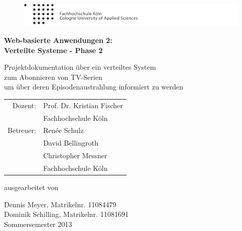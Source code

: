 
\begin{titlepage}

\begin{center}

\begin{figure}[!ht]
	\centering
		\includegraphics[natwidth=920pt, natheight=95pt, width=1.0\textwidth]{inc/logoheader.pdf}
\end{figure}

\vspace{4.0cm}

\begin{Huge}
	\textbf{Web-basierte Anwendungen 2:}\\
	\vspace{0.1cm}
	\textbf{Verteilte Systeme - Phase 2}\\
\end{Huge}

\vspace{0.8cm}

\begin{LARGE}
	Projektdokumentation über ein verteiltes System\\
	\vspace{0.1cm}
	zum Abonnieren von TV-Serien\\
	\vspace{0.1cm}
	um über deren Episodenaustrahlung informiert zu werden\\
\end{LARGE}

\vspace{2.5cm}

\begin{tabular}{rl}
        Dozent:  &  Prof. Dr. Kristian Fischer\\
       			 &  \small Fachhochschule Köln \\[1.0em]
      Betreuer:  &  Renée Schulz\\
				 &  David Bellingroth\\
				 &  Christopher Messner\\
       			 &  \small Fachhochschule Köln\\
\end{tabular}

\vspace{2.0cm}

\begin{large}
	ausgearbeitet von\\
	\vspace{0.2cm}
\end{large}

\begin{Large}
	Dennis Meyer, Matrikelnr. 11084479\\
	Dominik Schilling, Matrikelnr. 11081691\\
	\vspace{1cm}
	Sommersemester 2013
\end{Large}

\end{center}

\end{titlepage}
